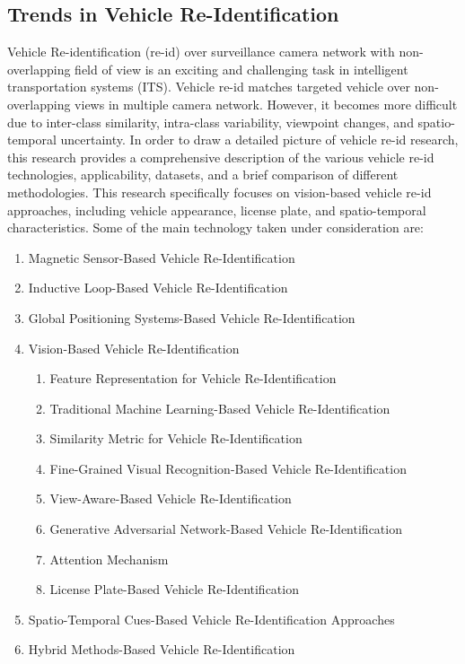 \subsection{Trends in Vehicle Re-Identification}
Vehicle Re-identification (re-id) over surveillance camera network with non-overlapping
field of view is an exciting and challenging task in intelligent transportation systems (ITS). Vehicle re-id matches targeted vehicle over non-overlapping views in multiple camera network. However, it becomes more difficult due to inter-class similarity, intra-class variability, viewpoint changes, and spatio-temporal uncertainty. In order to draw a detailed picture of vehicle re-id research, this research \cite{deng2021trends} provides a comprehensive description of the various vehicle re-id technologies, applicability, datasets, and a brief comparison of different methodologies. 
This research specifically focuses on vision-based vehicle re-id approaches, including vehicle appearance, license plate, and spatio-temporal characteristics. Some of the main technology taken under consideration are:
\begin{enumerate}
	\item Magnetic Sensor-Based Vehicle Re-Identification
	\item Inductive Loop-Based Vehicle Re-Identification
	\item Global Positioning Systems-Based Vehicle Re-Identification
	\item Vision-Based Vehicle Re-Identification
	\begin{enumerate}
		\item Feature Representation for Vehicle Re-Identification
		\item Traditional Machine Learning-Based Vehicle Re-Identification
		\item Similarity Metric for Vehicle Re-Identification
		\item Fine-Grained Visual Recognition-Based Vehicle Re-Identification
		\item View-Aware-Based Vehicle Re-Identification
		\item Generative Adversarial Network-Based Vehicle Re-Identification
		\item Attention Mechanism
		\item License Plate-Based Vehicle Re-Identification
	\end{enumerate}
	\item Spatio-Temporal Cues-Based Vehicle Re-Identification Approaches
	\item Hybrid Methods-Based Vehicle Re-Identification
\end{enumerate}


